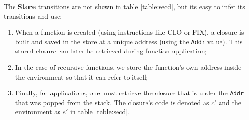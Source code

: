 The \textbf{Store} transitions are not shown in table \ref{table:secd}, but its easy to infer its transitions and use:
\begin{enumerate}
  \item When a function is created (using instructions like CLO or FIX), a closure is built and saved in 
    the store at a unique address (using the \texttt{Addr} value). This stored closure can later be 
    retrieved during function application;
  \item In the case of recursive functions, we store the function's own address inside the environment 
    so that it can refer to itself;
  \item Finally, for applications, one must retrieve the closure that is under the \texttt{Addr} that was popped
    from the stack. The closure's code is denoted as \( c' \) and the environment as \( e' \) in table \ref{table:secd}.
\end{enumerate}

